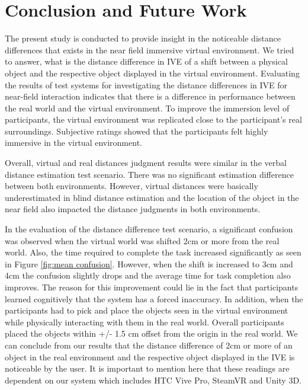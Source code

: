 \chapter{Conclusion and Future Work}
\label{sec:Conclusion and Future Work}
The present study is conducted to provide insight in the noticeable distance differences that exists in the near field immersive virtual environment. We tried to answer, what is the distance difference in IVE of a shift between a physical object and the respective object displayed in the virtual environment. Evaluating the results of test systems for investigating the distance differences in IVE for near-field interaction indicates that there is a difference in performance between the real world and the virtual environment. To improve the immersion level of participants, the virtual environment was replicated close to the participant’s real surroundings. Subjective ratings showed that the participants felt highly immersive in the virtual environment.\par 

Overall, virtual and real distances judgment results were similar in the verbal distance estimation test scenario. There was no significant estimation difference between both environments. However, virtual distances were basically underestimated in blind distance estimation and the location of the object in the near field also impacted the distance judgments in both environments. \par 
  
In the evaluation of the distance difference test scenario, a significant confusion was observed when the virtual world was shifted 2cm or more from the real world. Also, the time required to complete the task increased significantly as seen in Figure \ref{fig:mean confusion}. However,  when the shift is increased to 3cm and 4cm the confusion slightly drops and the average time for task completion also improves. The reason for this improvement could lie in the fact that participants learned cognitively that the system has a forced inaccuracy. In addition, when the participants had to pick and place the objects seen in the virtual environment while physically interacting with them in the real world. Overall participants placed the objects within +/- 1.5 cm offset from the origin in the real world. We can conclude from our results that the distance difference of 2cm or more of an object in the real environment and the respective object displayed in the IVE is noticeable by the user. It is important to mention here that these readings are dependent on our system which includes HTC Vive Pro, SteamVR and Unity 3D. \par

